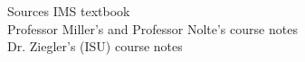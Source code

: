 \documentclass{beamer}
\begin{document}
%
%
%
%
%
%
%
%

\begin{frame}{Sources}
IMS textbook \\
Professor Miller's and Professor Nolte's course notes\\
Dr. Ziegler's (ISU) course notes

\end{frame}





%
%



\end{document}
